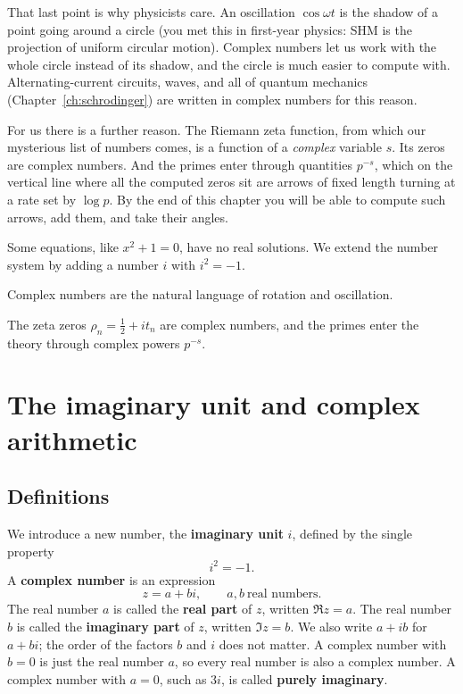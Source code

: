 That last point is why physicists care. An oscillation $\cos\omega t$ is the shadow of a point going around a circle (you met this in first-year physics: SHM is the projection of uniform circular motion). Complex numbers let us work with the whole circle instead of its shadow, and the circle is much easier to compute with. Alternating-current circuits, waves, and all of quantum mechanics (Chapter~\ref{ch:schrodinger}) are written in complex numbers for this reason.

For us there is a further reason. The Riemann zeta function, from which our mysterious list of numbers comes, is a function of a \emph{complex} variable $s$. Its zeros are complex numbers. And the primes enter through quantities $p^{-s}$, which on the vertical line where all the computed zeros sit are arrows of fixed length turning at a rate set by $\log p$. By the end of this chapter you will be able to compute such arrows, add them, and take their angles.

\begin{keyideas}
\item Some equations, like $x^2+1=0$, have no real solutions. We extend the number system by adding a number $i$ with $i^2=-1$.
\item Complex numbers are the natural language of rotation and oscillation.
\item The zeta zeros $\rho_n=\tfrac12+it_n$ are complex numbers, and the primes enter the theory through complex powers $p^{-s}$.
\end{keyideas}

\section{The imaginary unit and complex arithmetic}\label{sec:complex-arith}

\subsection{Definitions}

We introduce a new number, the \textbf{imaginary unit} $i$, defined by the single property
\begin{equation}
i^2=-1.\label{eq:complex-i}
\end{equation}
A \textbf{complex number} is an expression
\begin{equation}
z=a+bi,\qquad a,b\ \text{real numbers}.\label{eq:complex-z}
\end{equation}
The real number $a$ is called the \textbf{real part} of $z$, written $\Re z=a$. The real number $b$ is called the \textbf{imaginary part} of $z$, written $\Im z=b$. We also write $a+ib$ for $a+bi$; the order of the factors $b$ and $i$ does not matter. A complex number with $b=0$ is just the real number $a$, so every real number is also a complex number. A complex number with $a=0$, such as $3i$, is called \textbf{purely imaginary}.

